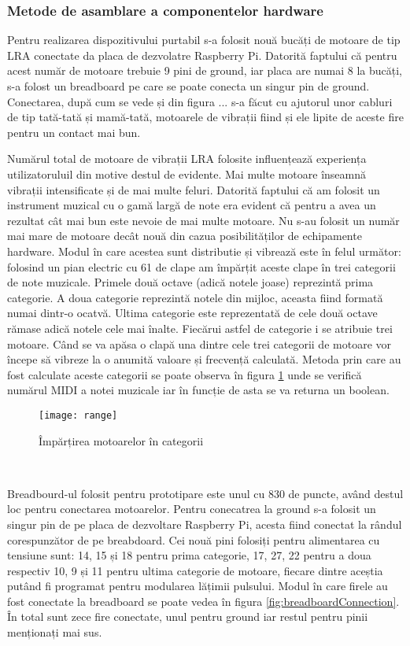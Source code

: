 \documentclass[../IoMusT.tex]{subfiles}
\begin{document}
\subsubsection{Metode de asamblare a componentelor hardware}
Pentru realizarea dispozitivului purtabil s-a folosit nouă bucăți de motoare de tip LRA conectate da placa de dezvolatre Raspberry Pi. Datorită faptului că pentru acest număr de motoare trebuie 9 pini de ground, iar placa are numai 8 la bucăți, s-a folost un breadboard  pe care se poate conecta un singur pin de ground. Conectarea, după cum se vede și din figura ... s-a făcut cu ajutorul unor cabluri de tip tată-tată și mamă-tată, motoarele de vibrații fiind și ele lipite  de aceste fire pentru un contact mai bun.
\\
\par Numărul total de motoare de vibrații LRA folosite influențează experiența utilizatoruluil din motive destul de evidente. Mai multe motoare înseamnă vibrații intensificate și de mai multe feluri. Datorită faptului că am folosit un instrument muzical cu o gamă largă de note era evident că pentru a avea un rezultat cât mai bun este nevoie de mai multe motoare. Nu s-au folosit un număr mai mare de motoare decât nouă din cazua posibilităților de echipamente hardware. Modul în care acestea sunt distributie și vibrează este în felul următor: folosind un pian electric cu 61 de clape am împărțit aceste clape în trei categorii de note muzicale. Primele două octave (adică notele joase) reprezintă prima categorie. A doua categorie reprezintă notele din mijloc, aceasta fiind formată numai dintr-o ocatvă. Ultima categorie este reprezentată de cele două octave rămase adică notele cele mai înalte. Fiecărui astfel de categorie i se atribuie trei motoare. Când se va apăsa o clapă una dintre cele trei categorii de motoare vor începe să vibreze la o anumită valoare și frecvență calculată. Metoda prin care au fost calculate aceste categorii se poate observa în figura \ref{fig:range} unde se verifică numărul MIDI a notei muzicale iar în funcție de asta se va returna un boolean.
\begin{figure}[h]
\centering
\texttt{[image: range]}
\caption{Împărțirea motoarelor în categorii}
\label{fig:range}
\end{figure}  
\\
\par Breadbourd-ul folosit pentru prototipare este unul cu 830 de puncte, având destul loc pentru conectarea motoarelor. Pentru conecatrea la ground s-a folosit un singur pin de pe placa de dezvoltare  Raspberry Pi, acesta fiind conectat la rândul corespunzător de pe breabdoard. Cei nouă pini folosiți pentru alimentarea cu tensiune sunt: 14, 15 și 18 pentru prima categorie, 17, 27, 22 pentru a doua respectiv 10, 9 și 11 pentru ultima categorie de motoare, fiecare dintre aceștia putând fi programat pentru modularea lățimii pulsului. Modul în care firele au fost conectate la breadboard se poate vedea în figura \ref{fig:breadboardConnection}. În total sunt zece fire conectate, unul pentru ground iar restul pentru pinii menționați mai sus.
\end{document}
